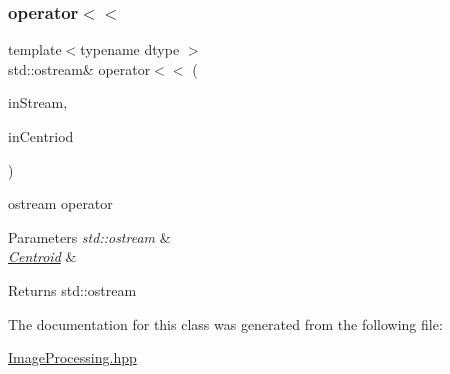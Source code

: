 \subsubsection{\texorpdfstring{operator$<$$<$}{operator<<}}
{\footnotesize\ttfamily template$<$typename dtype $>$ \\
std\+::ostream\& operator$<$$<$ (\begin{DoxyParamCaption}\item[{std\+::ostream \&}]{in\+Stream,  }\item[{const \mbox{\hyperlink{class_num_c_1_1_image_processing_1_1_centroid}{Centroid}} \&}]{in\+Centriod }\end{DoxyParamCaption})\hspace{0.3cm}{\ttfamily [friend]}}

ostream operator


\begin{DoxyParams}{Parameters}
{\em std\+::ostream} & \\
\hline
{\em \mbox{\hyperlink{class_num_c_1_1_image_processing_1_1_centroid}{Centroid}}} & \\
\hline
\end{DoxyParams}
\begin{DoxyReturn}{Returns}
std\+::ostream 
\end{DoxyReturn}


The documentation for this class was generated from the following file\+:\begin{DoxyCompactItemize}
\item 
\mbox{\hyperlink{_image_processing_8hpp}{Image\+Processing.\+hpp}}\end{DoxyCompactItemize}
